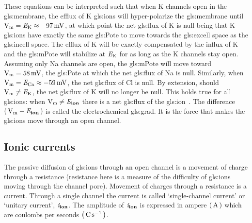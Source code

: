 \documentclass[class={myRUCProject}, crop=false]{standalone}
\begin{document}
These equations can be interpreted such that when
\gls{K} channels open in the \gls{gls:membrane}, the efflux of \gls{K} \glspl{gls:ion} will hyper-polarize the \gls{gls:membrane} until \(\unit{\V\membrane} = \equi\potassium \approx \qty{-97}{\mV}\), at which point the net \gls{gls:flux} of \gls{K} is null being that \gls{K} \glspl{gls:ion} have exactly the same \gls{gls:Pote} to move towards the \gls{gls:excell} space as the \gls{gls:incell} space. 
The efflux of \gls{K} will be exactly compensated by the influx of \gls{K} and the \gls{gls:mPote} will stabilize at \(\mathit{E}_\mathrm{K}\) for as long as the \gls{K} channels stay open. 
Assuming only \gls{Na} channels are open, the \gls{gls:mPote} will move toward \(\unit{\V\membrane} = \qty{58}{\mV}\), the \gls{gls:Pote} at which the net \gls{gls:flux} of \gls{Na} is null. 
Similarly, when \(\unit{\V\membrane} = \equi\chlorine \approx \qty{-59}{\mV}\), 
the net \gls{gls:flux} of \gls{Cl} is null. 
By extension, should \(\unit{\V\membrane} \neq \equi\potassium\), the net \gls{gls:flux} of \gls{K} will no longer be null. 
This holds true for all \glspl{gls:ion}: when \(\unit{\V\membrane} \neq \equi\ion\) there is a net \gls{gls:flux} of the \gls{gls:ion}~\cite{Hammond2015ch4}. The difference \(\br{\unit{\V\membrane} - \equi\ion}\) is called the electrochemical \gls{gls:grad}. It is the force that makes the \glspl{gls:ion} move through an open channel.

\endgroup

\subsection{Ionic currents}
The passive diffusion of \glspl{gls:ion} through an open channel is a movement of charge through a resistance (resistance here is a measure of the difficulty of \glspl{gls:ion} moving through the channel pore). Movement of charges through a resistance is a current. Through a single channel the current is called `single-channel current' or `unitary current', \(\mathit{i}_\mathbf{ion}\). The amplitude of \(\mathit{i}_\mathbf{ion}\) is expressed in ampere \(\br{\unit{\ampere}}\) which are coulombs per seconds \(\br{\unit{\coulomb\per\second}}\). 
\end{document}
